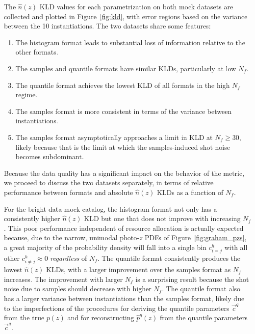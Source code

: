 \documentclass[\docopts]{\docclass}
\newcommand{\pz}{photo-$z$ PDF}
\newcommand{\mgdata}{bright\xspace}
\begin{document}
The $\hat{n}(z)$ KLD values for each parametrization on both mock datasets are 
collected and plotted in Figure~\ref{fig:kld}, with error regions based on the 
variance between the 10 instantiations.
The two datasets share some features:
\begin{enumerate}
\item The histogram format leads to substantial loss of information relative to 
the other formats.
\item The samples and quantile formats have similar KLDs, particularly at low 
$N_{f}$.
\item The quantile format achieves the lowest KLD of all formats in the high 
$N_{f}$ regime.
\item The samples format is more consistent in terms of the variance between 
instantiations.
\item The samples format asymptotically approaches a limit in KLD at 
$N_{f}\geq30$, likely because that is the limit at which the samples-induced 
shot noise becomes subdominant.
\end{enumerate}
Because the data quality has a significant impact on the behavior of the 
metric, we proceed to discuss the two datasets separately, in terms of relative 
performance between formats and absolute $\hat{n}(z)$ KLDs as a function of 
$N_{f}$.


For the \mgdata data mock catalog, the histogram format not only has a 
consistently higher $\hat{n}(z)$ KLD but one that does not improve with 
increasing $N_{f}$.
This poor performance independent of resource allocation is actually expected 
because, due to the narrow, unimodal \pz s of Figure~\ref{fig:graham_pzs}, a 
great majority of the probability density will fall into a single bin 
$c^{h}_{i=j}$ with all other $c^{h}_{i\neq j}\approx 0$ \textit{regardless} of 
$N_{f}$.
The quantile format consistently produces the lowest $\hat{n}(z)$ KLDs, with a 
larger improvement over the samples format as $N_{f}$ increases.
The improvement with larger $N_{f}$ is a surprising result because the shot 
noise due to samples should decrease with higher $N_{f}$.
The quantile format also has a larger variance between instantiations than the 
samples format, likely due to the imperfections of the procedures for deriving 
the quantile parameters $\vec{c}^{q}$ from the true $p(z)$ and for 
reconstructing $\hat{p}^{q}(z)$ from the quantile parameters $\vec{c}^{q}$.
\end{document}
